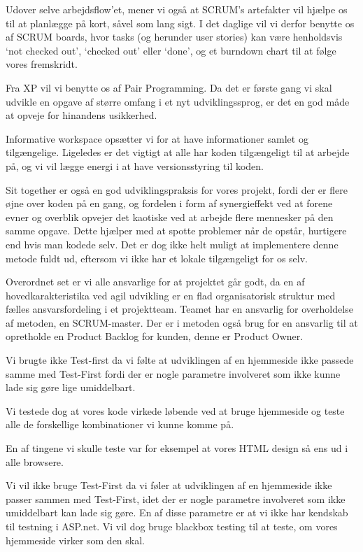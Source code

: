 \documentclass[12pt, a4paper]{report}
\begin{document}
Udover selve arbejdsflow’et, mener vi også at SCRUM’s artefakter vil hjælpe os til at planlægge på kort, såvel som lang sigt. I det daglige vil vi derfor benytte os af SCRUM boards, hvor tasks (og herunder user stories) kan være henholdsvis ‘not checked out’, ‘checked out’ eller ‘done’, og et burndown chart til at følge vores fremskridt.

Fra XP vil vi benytte os af Pair Programming. Da det er første gang vi skal udvikle en opgave af større omfang i et nyt udviklingssprog, er det en god måde at opveje for hinandens usikkerhed.

Informative workspace opsætter vi for at have informationer samlet og tilgængelige. Ligeledes er det vigtigt at alle har koden tilgængeligt til at arbejde på, og vi vil lægge energi i at have versionsstyring til koden.

Sit together er også en god udviklingspraksis for vores projekt, fordi der er flere øjne over koden på en gang, og fordelen i form af synergieffekt ved at forene evner og overblik opvejer det kaotiske ved at arbejde flere mennesker på den samme opgave. Dette hjælper med at spotte problemer når de opstår, hurtigere end hvis man kodede selv. Det er dog ikke helt muligt at implementere denne metode fuldt ud, eftersom vi ikke har et lokale tilgængeligt for os selv.

Overordnet set er vi alle ansvarlige for at projektet går godt, da en af hovedkarakteristika ved agil udvikling er en flad organisatorisk struktur med fælles ansvarsfordeling i et projektteam. Teamet har en ansvarlig for overholdelse af metoden, en SCRUM-master. Der er i metoden også brug for en ansvarlig til at opretholde en Product Backlog for kunden, denne er Product Owner.

Vi brugte ikke Test-first da vi følte at udviklingen af en hjemmeside ikke passede samme med Test-First fordi der er nogle parametre involveret som ikke kunne lade sig gøre lige umiddelbart.

Vi testede dog at vores kode virkede løbende ved at bruge hjemmeside og teste alle de forskellige kombinationer vi kunne komme på.

En af tingene vi skulle teste var for eksempel at vores HTML design så ens ud i alle browsere.

Vi vil ikke bruge Test-First da vi føler at udviklingen af en hjemmeside ikke passer sammen med Test-First, idet der er nogle parametre involveret som ikke umiddelbart kan lade sig gøre. En af disse parametre er at vi ikke har kendskab til testning i ASP.net.
Vi vil dog bruge blackbox testing til at teste, om vores hjemmeside virker som den skal.
\end{document}
